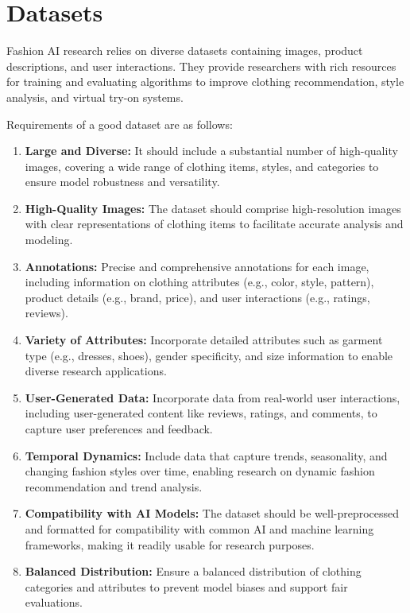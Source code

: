 \section{Datasets} \label{section:datasets}

	Fashion AI research relies on diverse datasets containing images, product descriptions, and user interactions. They provide researchers with rich resources for training and evaluating algorithms to improve clothing recommendation, style analysis, and virtual try-on systems.

	Requirements of a good dataset are as follows:

	\begin{enumerate}
		\item \textbf{Large and Diverse:} It should include a substantial number of high-quality images, covering a wide range of clothing items, styles, and categories to ensure model robustness and versatility.
		\item \textbf{High-Quality Images:} The dataset should comprise high-resolution images with clear representations of clothing items to facilitate accurate analysis and modeling.
		\item \textbf{Annotations:} Precise and comprehensive annotations for each image, including information on clothing attributes (e.g., color, style, pattern), product details (e.g., brand, price), and user interactions (e.g., ratings, reviews).
		\item \textbf{Variety of Attributes:} Incorporate detailed attributes such as garment type (e.g., dresses, shoes), gender specificity, and size information to enable diverse research applications.
		\item \textbf{User-Generated Data:} Incorporate data from real-world user interactions, including user-generated content like reviews, ratings, and comments, to capture user preferences and feedback.
		\item \textbf{Temporal Dynamics:} Include data that capture trends, seasonality, and changing fashion styles over time, enabling research on dynamic fashion recommendation and trend analysis.
		\item \textbf{Compatibility with AI Models:} The dataset should be well-preprocessed and formatted for compatibility with common AI and machine learning frameworks, making it readily usable for research purposes.
		\item \textbf{Balanced Distribution:} Ensure a balanced distribution of clothing categories and attributes to prevent model biases and support fair evaluations.

\end{enumerate}
